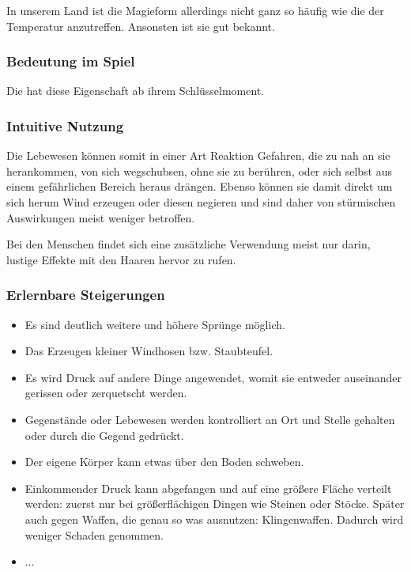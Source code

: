 In unserem Land ist die Magieform allerdings nicht ganz so häufig wie die der Temperatur anzutreffen. Ansonsten ist sie gut bekannt.

\subsubsection{Bedeutung im Spiel}
Die  hat diese Eigenschaft ab ihrem Schlüsselmoment. 

\subsubsection{Intuitive Nutzung}
Die Lebewesen können somit in einer Art Reaktion Gefahren, die zu nah an sie herankommen, von sich wegschubsen, ohne sie zu berühren, oder sich selbst aus einem gefährlichen Bereich heraus drängen. Ebenso können sie damit direkt um sich herum Wind erzeugen oder diesen negieren und sind daher von stürmischen Auswirkungen meist weniger betroffen.

Bei den Menschen findet sich eine zusätzliche Verwendung meist nur darin, lustige Effekte mit den Haaren hervor zu rufen.

\subsubsection{Erlernbare Steigerungen}
\begin{itemize}
	\item Es sind deutlich weitere und höhere Sprünge möglich.
	\item Das Erzeugen kleiner Windhosen bzw. Staubteufel.
	\item Es wird Druck auf andere Dinge angewendet, womit sie entweder auseinander gerissen oder zerquetscht werden.
	\item Gegenstände oder Lebewesen werden kontrolliert an Ort und Stelle gehalten oder durch die Gegend gedrückt.
	\item Der eigene Körper kann etwas über den Boden schweben.
	\item Einkommender Druck kann abgefangen und auf eine größere Fläche verteilt werden: zuerst nur bei größerflächigen Dingen wie Steinen oder Stöcke. Später auch gegen Waffen, die genau so was ausnutzen: Klingenwaffen. Dadurch wird weniger Schaden genommen.
	\item ...
\end{itemize}

